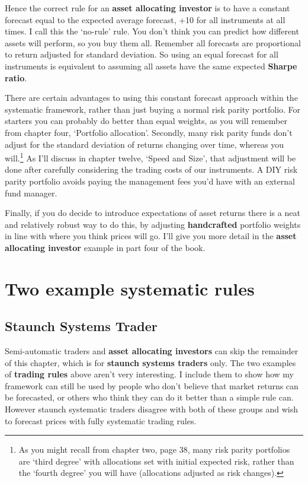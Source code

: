 Hence the correct rule for an \textbf{asset allocating investor} is to have a constant forecast equal to the expected average forecast, +10 for all instruments at all times. I call this the ‘no-rule' rule. You don't think you can predict how different assets will perform, so you buy them all. Remember all forecasts are proportional to return adjusted for standard deviation. So using an equal forecast for all instruments is equivalent to assuming all assets have the same expected \textbf{Sharpe ratio}.

There are certain advantages to using this constant forecast approach within the systematic framework, rather than just buying a normal risk parity portfolio. For starters you can probably do better than equal weights, as you will remember from chapter four, ‘Portfolio allocation'. Secondly, many risk parity funds don't adjust for the standard deviation of returns changing over time, whereas you will.\footnote{As you might recall from chapter two, page 38, many risk parity portfolios are ‘third degree’ with allocations set with initial expected risk, rather than the ‘fourth degree’ you will have (allocations adjusted as risk changes).} As I'll discuss in chapter twelve, ‘Speed and Size', that adjustment will be done after carefully considering the trading costs of our instruments. A DIY risk parity portfolio avoids paying the management fees you'd have with an external fund manager.

Finally, if you do decide to introduce expectations of asset returns there is a neat and relatively robust way to do this, by adjusting \textbf{handcrafted} portfolio weights in line with where you think prices will go. I'll give you more detail in the \textbf{asset allocating investor} example in part four of the book.

\section*{Two example systematic rules}  {}

\subsection*{Staunch Systems Trader}

Semi-automatic traders and \textbf{asset allocating investors} can skip the remainder of this chapter, which is for \textbf{staunch systems traders} only. The two examples of \textbf{trading rules} above aren't very interesting. I include them to show how my framework can still be used by people who don't believe that market returns can be forecasted, or others who think they can do it better than a simple rule can. However staunch systematic traders disagree with both of these groups and wish to forecast prices with fully systematic trading rules.

